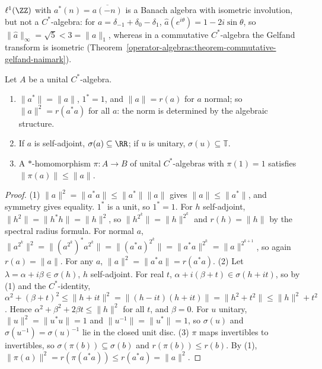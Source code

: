 \begin{counterexample}\label{operator-algebras:counterexample-l1-not-cstar}
$\ell^1(\ZZ)$ with $a^*(n) = \overline{a(-n)}$ is a Banach algebra with isometric involution, but not a $C^*$-algebra: for $a = \delta_{-1} + \delta_0 - \delta_1$,
$\hat a(e^{i\theta}) = 1 - 2i\sin\theta$, so $\|\hat a\|_\infty = \sqrt5 < 3 = \|a\|_1$, whereas in a commutative $C^*$-algebra the Gelfand transform is isometric (Theorem~\ref{operator-algebras:theorem-commutative-gelfand-naimark}).
\end{counterexample}

\begin{proposition}\label{operator-algebras:proposition-cstar-basic}
Let $A$ be a unital $C^*$-algebra.
\begin{enumerate}
\item $\|a^*\| = \|a\|$, $1^* = 1$, and $\|a\| = r(a)$ for $a$ normal; so $\|a\|^2 = r(a^*a)$ for all $a$: the norm is determined by the algebraic structure.
\item If $a$ is self-adjoint, $\sigma(a) \subseteq \RR$; if $u$ is unitary, $\sigma(u) \subseteq \mathbb{T}$.
\item A $*$-homomorphism $\pi \colon A \to B$ of unital $C^*$-algebras with $\pi(1) = 1$ satisfies $\|\pi(a)\| \leq \|a\|$.
\end{enumerate}
\end{proposition}

\begin{proof}
(1) $\|a\|^2 = \|a^*a\| \leq \|a^*\|\|a\|$ gives $\|a\| \leq \|a^*\|$, and symmetry gives equality. $1^*$ is a unit, so $1^* = 1$. For $h$ self-adjoint, $\|h^2\| = \|h^*h\| = \|h\|^2$, so $\|h^{2^k}\| = \|h\|^{2^k}$ and
$r(h) = \|h\|$ by the spectral radius formula. For normal $a$, $\|a^{2^k}\|^2 = \|(a^{2^k})^*a^{2^k}\| = \|(a^*a)^{2^k}\| = \|a^*a\|^{2^k} = \|a\|^{2^{k+1}}$, so again $r(a) = \|a\|$. For any $a$, $\|a\|^2 = \|a^*a\| = r(a^*a)$.
(2) Let $\lambda = \alpha + i\beta \in \sigma(h)$, $h$ self-adjoint. For real $t$, $\alpha + i(\beta + t) \in \sigma(h + it)$, so by (1) and the $C^*$-identity,
$\alpha^2 + (\beta + t)^2 \leq \|h + it\|^2 = \|(h - it)(h + it)\| = \|h^2 + t^2\| \leq \|h\|^2 + t^2$. Hence $\alpha^2 + \beta^2 + 2\beta t \leq \|h\|^2$ for all $t$, and $\beta = 0$. For $u$ unitary, $\|u\|^2 = \|u^*u\| = 1$ and
$\|u^{-1}\| = \|u^*\| = 1$, so $\sigma(u)$ and $\sigma(u^{-1}) = \sigma(u)^{-1}$ lie in the closed unit disc.
(3) $\pi$ maps invertibles to invertibles, so $\sigma(\pi(b)) \subseteq \sigma(b)$ and $r(\pi(b)) \leq r(b)$. By (1), $\|\pi(a)\|^2 = r(\pi(a^*a)) \leq r(a^*a) = \|a\|^2$.
\end{proof}

